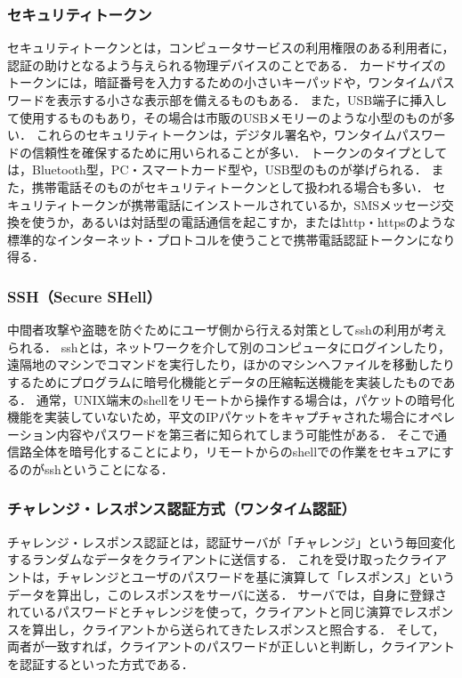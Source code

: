 \subsubsection{セキュリティトークン}
セキュリティトークンとは，コンピュータサービスの利用権限のある利用者に，認証の助けとなるよう与えられる物理デバイスのことである．
カードサイズのトークンには，暗証番号を入力するための小さいキーパッドや，ワンタイムパスワードを表示する小さな表示部を備えるものもある．
また，USB端子に挿入して使用するものもあり，その場合は市販のUSBメモリーのような小型のものが多い．
これらのセキュリティトークンは，デジタル署名や，ワンタイムパスワードの信頼性を確保するために用いられることが多い．
トークンのタイプとしては，Bluetooth型，PC・スマートカード型や，USB型のものが挙げられる．
また，携帯電話そのものがセキュリティトークンとして扱われる場合も多い．
セキュリティトークンが携帯電話にインストールされているか，SMSメッセージ交換を使うか，あるいは対話型の電話通信を起こすか，またはhttp・httpsのような標準的なインターネット・プロトコルを使うことで携帯電話認証トークンになり得る．

\subsubsection{SSH（Secure SHell）}
中間者攻撃や盗聴を防ぐためにユーザ側から行える対策としてsshの利用が考えられる．
sshとは，ネットワークを介して別のコンピュータにログインしたり，遠隔地のマシンでコマンドを実行したり，ほかのマシンへファイルを移動したりするためにプログラムに暗号化機能とデータの圧縮転送機能を実装したものである．
通常，UNIX端末のshellをリモートから操作する場合は，パケットの暗号化機能を実装していないため，平文のIPパケットをキャプチャされた場合にオペレーション内容やパスワードを第三者に知られてしまう可能性がある．
そこで通信路全体を暗号化することにより，リモートからのshellでの作業をセキュアにするのがsshということになる．

\subsubsection{チャレンジ・レスポンス認証方式（ワンタイム認証）}
チャレンジ・レスポンス認証とは，認証サーバが「チャレンジ」という毎回変化するランダムなデータをクライアントに送信する．
これを受け取ったクライアントは，チャレンジとユーザのパスワードを基に演算して「レスポンス」というデータを算出し，このレスポンスをサーバに送る．
サーバでは，自身に登録されているパスワードとチャレンジを使って，クライアントと同じ演算でレスポンスを算出し，クライアントから送られてきたレスポンスと照合する．
そして，両者が一致すれば，クライアントのパスワードが正しいと判断し，クライアントを認証するといった方式である．

